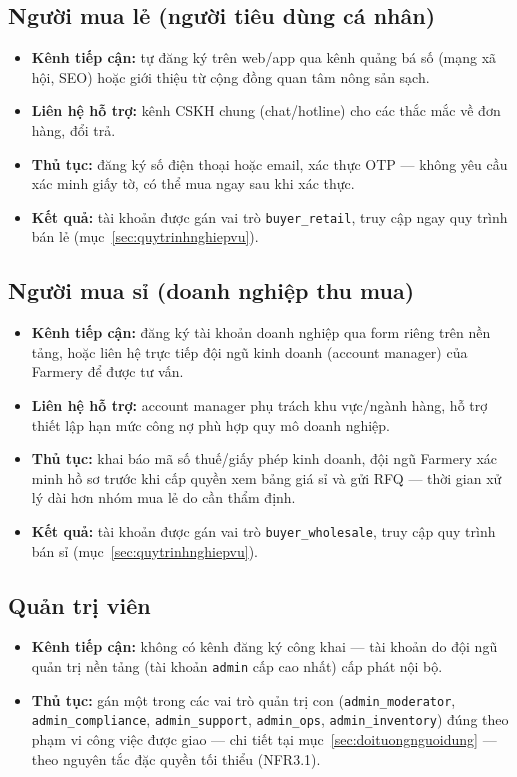\subsection*{Người mua lẻ (người tiêu dùng cá nhân)}
\begin{itemize}
    \item \textbf{Kênh tiếp cận:} tự đăng ký trên web/app qua kênh quảng bá số (mạng xã hội, SEO) hoặc giới thiệu từ cộng đồng quan tâm nông sản sạch.
    \item \textbf{Liên hệ hỗ trợ:} kênh CSKH chung (chat/hotline) cho các thắc mắc về đơn hàng, đổi trả.
    \item \textbf{Thủ tục:} đăng ký số điện thoại hoặc email, xác thực OTP — không yêu cầu xác minh giấy tờ, có thể mua ngay sau khi xác thực.
    \item \textbf{Kết quả:} tài khoản được gán vai trò \texttt{buyer\_retail}, truy cập ngay quy trình bán lẻ (mục~\ref{sec:quytrinhnghiepvu}).
\end{itemize}

\subsection*{Người mua sỉ (doanh nghiệp thu mua)}
\begin{itemize}
    \item \textbf{Kênh tiếp cận:} đăng ký tài khoản doanh nghiệp qua form riêng trên nền tảng, hoặc liên hệ trực tiếp đội ngũ kinh doanh (account manager) của Farmery để được tư vấn.
    \item \textbf{Liên hệ hỗ trợ:} account manager phụ trách khu vực/ngành hàng, hỗ trợ thiết lập hạn mức công nợ phù hợp quy mô doanh nghiệp.
    \item \textbf{Thủ tục:} khai báo mã số thuế/giấy phép kinh doanh, đội ngũ Farmery xác minh hồ sơ trước khi cấp quyền xem bảng giá sỉ và gửi RFQ — thời gian xử lý dài hơn nhóm mua lẻ do cần thẩm định.
    \item \textbf{Kết quả:} tài khoản được gán vai trò \texttt{buyer\_wholesale}, truy cập quy trình bán sỉ (mục~\ref{sec:quytrinhnghiepvu}).
\end{itemize}

\subsection*{Quản trị viên}
\begin{itemize}
    \item \textbf{Kênh tiếp cận:} không có kênh đăng ký công khai — tài khoản do đội ngũ quản trị nền tảng (tài khoản \texttt{admin} cấp cao nhất) cấp phát nội bộ.
    \item \textbf{Thủ tục:} gán một trong các vai trò quản trị con (\texttt{admin\_moderator}, \texttt{admin\_compliance}, \texttt{admin\_support}, \texttt{admin\_ops}, \texttt{admin\_inventory}) đúng theo phạm vi công việc được giao — chi tiết tại mục~\ref{sec:doituongnguoidung} — theo nguyên tắc đặc quyền tối thiểu (NFR3.1).
\end{itemize}

